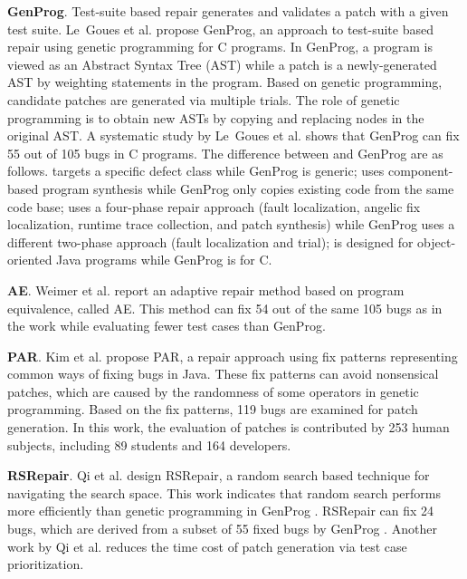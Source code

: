 \textbf{GenProg}. Test-suite based repair generates and validates a patch with a given test suite. Le~Goues et al. \cite{le2012genprog} propose GenProg, an approach to test-suite based repair using genetic programming for C programs. In GenProg, a program is viewed as an Abstract Syntax Tree (AST) while a patch is a newly-generated AST by weighting statements in the program. Based on genetic programming, candidate patches are generated via multiple trials. 
The role of genetic programming is to obtain new ASTs by copying and replacing nodes in the original AST. 
A systematic study by Le~Goues et al. \cite{le2012systematic} shows that GenProg can fix 55 out of 105 bugs in C programs. 
The difference between \nopol and GenProg are as follows. 
\nopol targets a specific defect class while GenProg is generic;
\nopol uses component-based program synthesis while GenProg only copies existing code from the same code base;
\nopol uses a four-phase repair approach (fault localization, angelic fix localization, runtime trace collection, and patch synthesis) while GenProg uses a different two-phase approach (fault localization and trial);
\nopol is designed for object-oriented Java programs while GenProg is for C. 

\textbf{AE}. Weimer et al. \cite{DBLP:conf/kbse/WeimerFF13} report an adaptive repair method based on program equivalence, called AE. This method can fix 54 out of the same 105 bugs as in the work \cite{le2012systematic} while evaluating fewer test cases than GenProg. 

\textbf{PAR}. Kim et al. \cite{Kim2013} propose PAR, a repair approach using fix patterns representing common ways of fixing bugs in Java. These fix patterns can avoid nonsensical patches, which are caused by the randomness of some operators in genetic programming. Based on the fix patterns, 119 bugs are examined for patch generation. In this work, the evaluation of patches is contributed by 253 human subjects, including 89 students and 164 developers. 

\textbf{RSRepair}. Qi et al. \cite{qi2014strength} design RSRepair, a random search based technique for navigating the search space. This work indicates that random search performs more efficiently than genetic programming in GenProg \cite{le2012genprog}. RSRepair can fix 24 bugs, which are derived from a subset of 55 fixed bugs by GenProg \cite{le2012systematic}. 
Another work by Qi et al. \cite{DBLP:conf/icsm/QiML13} reduces the time cost of patch generation via test case prioritization. 

